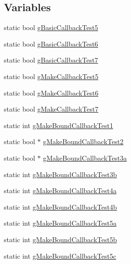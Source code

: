 \subsection*{Variables}
\begin{DoxyCompactItemize}
\item 
static bool \hyperlink{callback-test-suite_8cc_a3ee0087a0959db41a7a5a3693cdd690d}{g\+Basic\+Callback\+Test5}
\item 
static bool \hyperlink{callback-test-suite_8cc_afdd1cb850fcd2a9bc7f212300581dfc5}{g\+Basic\+Callback\+Test6}
\item 
static bool \hyperlink{callback-test-suite_8cc_a08a15f49aab77920052164226280b824}{g\+Basic\+Callback\+Test7}
\item 
static bool \hyperlink{callback-test-suite_8cc_a3c2be6ca31bccf7bf60f4cc218357d0d}{g\+Make\+Callback\+Test5}
\item 
static bool \hyperlink{callback-test-suite_8cc_ae0eb61fdcd477b3c7667b2f92b3da932}{g\+Make\+Callback\+Test6}
\item 
static bool \hyperlink{callback-test-suite_8cc_a82fa0bb4a2be7cd14378b6be5a27fe2e}{g\+Make\+Callback\+Test7}
\item 
static int \hyperlink{callback-test-suite_8cc_a3d1ab60494f3dec0f04a96e1a159929e}{g\+Make\+Bound\+Callback\+Test1}
\item 
static bool $\ast$ \hyperlink{callback-test-suite_8cc_a1caffc0c35f737606a8f10bd508dd0b9}{g\+Make\+Bound\+Callback\+Test2}
\item 
static bool $\ast$ \hyperlink{callback-test-suite_8cc_a4823c46db6aa3f6dc6f22d469530282b}{g\+Make\+Bound\+Callback\+Test3a}
\item 
static int \hyperlink{callback-test-suite_8cc_a89a5cbdc689d0e2873c1bdd0a02b911c}{g\+Make\+Bound\+Callback\+Test3b}
\item 
static int \hyperlink{callback-test-suite_8cc_adcdcedb8a5a0b5b8510241d9234bc437}{g\+Make\+Bound\+Callback\+Test4a}
\item 
static int \hyperlink{callback-test-suite_8cc_a6356e7aca7e7548fa5e66937402bc97b}{g\+Make\+Bound\+Callback\+Test4b}
\item 
static int \hyperlink{callback-test-suite_8cc_a13d61f210cc232207f749f18adbeac68}{g\+Make\+Bound\+Callback\+Test5a}
\item 
static int \hyperlink{callback-test-suite_8cc_a73d2d3738711a7ffa020bd2f9a6047f6}{g\+Make\+Bound\+Callback\+Test5b}
\item 
static int \hyperlink{callback-test-suite_8cc_a80c93f22789b8a166ab7261010f6ce83}{g\+Make\+Bound\+Callback\+Test5c}

\end{DoxyCompactItemize}
